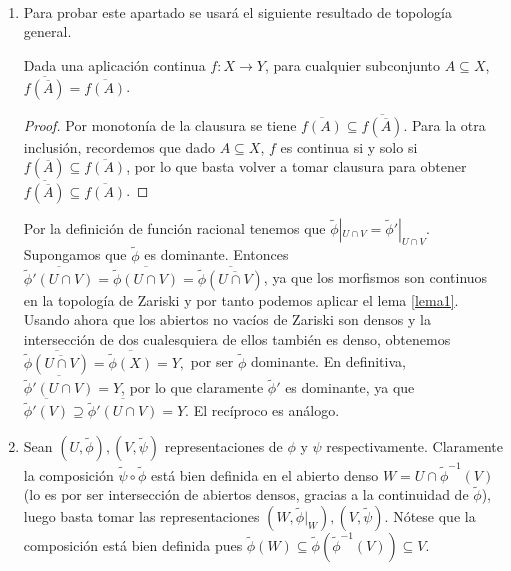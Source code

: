 \documentclass[twoside]{article}
\begin{document}
\begin{solucion}\
\begin{enumerate}
\item Para probar este apartado se usará el siguiente resultado de topología general.
\begin{lemma} \label{lema1}
Dada una aplicación continua $f:X\to Y$, para cualquier subconjunto $A\subseteq X$, $\overline{f(\overline{A})}=\overline{f(A)}$. 
\end{lemma}
\begin{proof}
Por monotonía de la clausura se tiene $\overline{f(A)}\subseteq\overline{f(\overline{A})}$. Para la otra inclusión, recordemos que dado $A\subseteq X$, $f$ es continua si y solo si $f(\overline{A})\subseteq\overline{f(A)}$, por lo que basta volver a tomar clausura para obtener $\overline{f(\overline{A})}\subseteq\overline{f(A)}$.
\end{proof}
 Por la definición de función racional tenemos que $\tilde{\phi}|_{U\cap V}=\tilde{\phi}'|_{U\cap V}$. Supongamos que $\tilde{\phi}$ es dominante. Entonces $\overline{\tilde{\phi}'(U\cap V)}=\overline{\tilde{\phi}(U\cap V)}=\overline{\tilde{\phi}(\overline{U\cap V})}$, ya que los morfismos son continuos en la topología de Zariski y por tanto podemos aplicar el lema \ref{lema1}. Usando ahora que los abiertos no vacíos de Zariski son densos y la intersección de dos cualesquiera de ellos también es denso, obtenemos $\overline{\tilde{\phi}(\overline{U\cap V})}=\overline{\tilde{\phi}(X)}=Y,$ por ser $\tilde{\phi}$ dominante. En definitiva, $\overline{\tilde{\phi}'(U\cap V)}=Y$, por lo que claramente $\tilde{\phi}'$ es dominante, ya que $\overline{\tilde{\phi}'(V)}\supseteq\overline{\tilde{\phi}'(U\cap V)}=Y$. El recíproco es análogo.
 \newpage
\item Sean $(U,\tilde{\phi}),(V,\tilde{\psi})$ representaciones de $\phi$ y $\psi$ respectivamente. Claramente la composición $\tilde{\psi}\circ\tilde{\phi}$ está bien definida en el abierto denso $W=U\cap\tilde{\phi}^{-1}(V)$ (lo es por ser intersección de abiertos densos, gracias a la continuidad de $\tilde{\phi}$), luego basta tomar las representaciones $(W,\tilde{\phi}|_W),(V,\tilde{\psi})$. Nótese que la composición está bien definida pues $\tilde{\phi}(W)\subseteq \tilde{\phi}(\tilde{\phi}^{-1}( V))\subseteq V$.


\end{enumerate}
\end{solucion}
\end{document}
